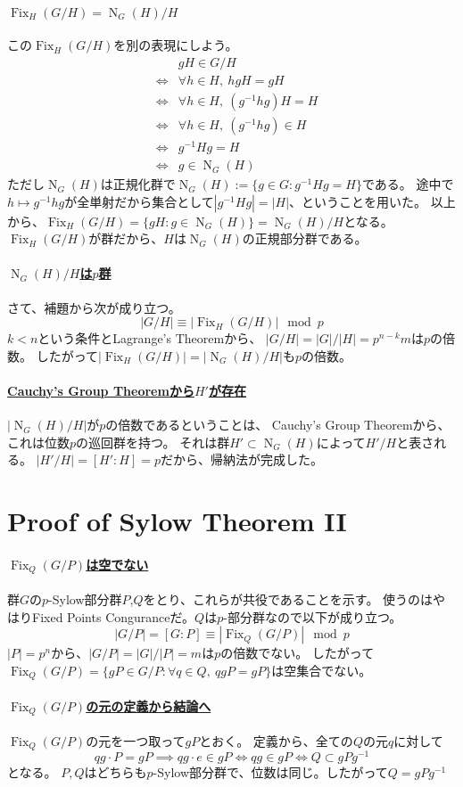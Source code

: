 \documentclass[a4paper]{jarticle}
\newcommand{\Fix}{\operatorname{Fix}}
\newcommand{\Norm}{\operatorname{N}}
\newcommand{\ulpar}[1]{\paragraph{\underline{#1}}}
\begin{document}
    \ulpar{$\Fix_{H}(G/H)=\Norm_G(H)/H$}
    この$\Fix_{H}(G/H)$を別の表現にしよう。
    \begin{eqnarray*}
        &{}&    gH \in G/H \\
        &\iff&  \forall h \in H,~ hgH=gH \\
        &\iff&  \forall h \in H,~ (g^{-1}hg)H=H \\
        &\iff&  \forall h \in H,~ (g^{-1}hg) \in H \\
        &\iff&  g^{-1}Hg = H \\
        &\iff&  g \in \Norm_G(H)
    \end{eqnarray*}
    ただし$\Norm_G(H)$は正規化群で$\Norm_G(H) := \{ g \in G : g^{-1}Hg = H\}$である。
    途中で$h \mapsto g^{-1}hg$が全単射だから集合として$|g^{-1}Hg|=|H|$、ということを用いた。
    以上から、$\Fix_{H}(G/H)=\{ gH : g \in \Norm_G(H) \} = \Norm_G(H)/H$となる。
    $\Fix_{H}(G/H)$が群だから、$H$は$\Norm_G(H)$の正規部分群である。

    \ulpar{$\Norm_G(H)/H$は$p$群}
    さて、補題から次が成り立つ。
    \[ |G/H| \equiv |\Fix_{H}(G/H)| \mod p \]
    $k<n$という条件とLagrange's Theoremから、
    $|G/H|=|G|/|H|=p^{n-k}m$は$p$の倍数。
    したがって$|\Fix_{H}(G/H)|=|\Norm_G(H)/H|$も$p$の倍数。

    \ulpar{Cauchy's Group Theoremから$H'$が存在}
    $|\Norm_G(H)/H|$が$p$の倍数であるということは、
    Cauchy's Group Theoremから、これは位数$p$の巡回群を持つ。
    それは群$H' \subset \Norm_G(H)$によって$H'/H$と表される。
    $|H'/H|=[H':H]=p$だから、帰納法が完成した。
    \QED

    \section{Proof of Sylow Theorem II}
    \ulpar{$\Fix_Q(G/P)$は空でない}
    群$G$の$p$-Sylow部分群$P$,$Q$をとり、これらが共役であることを示す。
    使うのはやはりFixed Points Conguranceだ。$Q$は$p$-部分群なので以下が成り立つ。
    \[ |G/P|=[G:P] \equiv |\Fix_Q(G/P)| \mod p \]
    $|P|=p^n$から、$|G/P|=|G|/|P|=m$は$p$の倍数でない。
    したがって$\Fix_Q(G/P)=\{ gP \in G/P : \forall q \in Q,~ qgP=gP \}$は空集合でない。

    \ulpar{$\Fix_Q(G/P)$の元の定義から結論へ}
    $\Fix_Q(G/P)$の元を一つ取って$gP$とおく。
    定義から、全ての$Q$の元$q$に対して
    \[ qg \cdot P=gP \implies qg \cdot e \in gP \iff qg \in gP \iff Q \subset gPg^{-1} \]となる。
    $P,Q$はどちらも$p$-Sylow部分群で、位数は同じ。したがって$Q=gPg^{-1}$
    \QED
\end{document}
